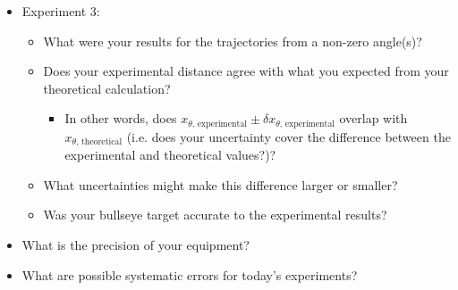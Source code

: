 \begin{itemize}
\item Experiment 3:
\begin{itemize}
    \item What were your results for the trajectories from a non-zero angle(s)?
    \item Does your experimental distance agree with what you expected from your theoretical calculation?
    \begin{itemize}
        \item In other words, does $x_{\theta\text{, experimental}} \pm \delta x_{\theta\text{, experimental}}$ overlap with $x_{\theta\text{, theoretical}}$ (i.e. does your uncertainty cover the difference between the experimental and theoretical values?)?
    \end{itemize}
    \item What uncertainties might make this difference larger or smaller?
    \item Was your bullseye target accurate to the experimental results?
\end{itemize}
\item What is the precision of your equipment?
\item What are possible systematic errors for today's experiments?

\end{itemize}




